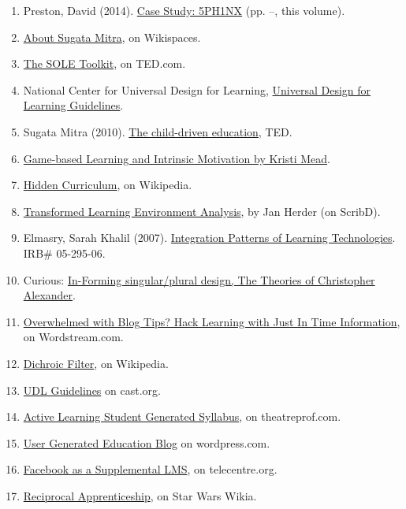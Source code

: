\begin{enumerate}
\item
  Preston, David (2014). \href{http://peeragogy.org/case-study-5ph1nx/}{Case Study:
  5PH1NX} (pp. \pageref{sphinx-beginning}--\pageref{sphinx-end}, this volume).
\item
  \href{http://sugatam.wikispaces.com/}{About Sugata Mitra}, on Wikispaces.
\item
  \href{http://www.ted.com/pages/sole\_toolkit}{The SOLE Toolkit}, on TED.com.
\item National Center for Universal Design for Learning,
  \href{http://www.udlcenter.org/aboutudl/udlguidelines}{Universal Design for
  Learning Guidelines}.
\item Sugata Mitra (2010).
  \href{http://www.ted.com/talks/sugata\_mitra\_the\_child\_driven\_education.html}{The child-driven education}, TED.
\item
  \href{http://www.academia.edu/1137269/Game-based\_Learning\_and\_Intrinsic\_Motivation}{Game-based
  Learning and Intrinsic Motivation by Kristi Mead}.
\item
  \href{http://en.wikipedia.org/wiki/Hidden\_curriculum}{Hidden Curriculum}, on Wikipedia.
\item
  \href{http://www.scribd.com/doc/181089012/Transformed-Learning-Environment-Analysis}{Transformed
  Learning Environment Analysis}, by Jan Herder (on ScribD).
\item
  Elmasry, Sarah Khalil (2007). \href{http://scholar.lib.vt.edu/theses/available/etd-09232007-220306/unrestricted/SElmasryETDbodytext.pdf}{Integration
  Patterns of Learning Technologies}. IRB\# 05-295-06.
\item
  Curious: \href{http://nourdiab.wordpress.com/2011/02/23/the-theories-of-christopher-alexander/}{In-Forming
  singular/plural design, The Theories of Christopher Alexander}.
\item
  \href{http://www.wordstream.com/blog/ws/2013/10/02/just-in-time-information-hacks}{Overwhelmed
  with Blog Tips? Hack Learning with Just In Time Information}, on Wordstream.com.
\item
  \href{http://en.wikipedia.org/wiki/Dichroic\_filter}{Dichroic Filter}, on Wikipedia.
\item \href{http://www.cast.org/library/UDLguidelines/}{UDL Guidelines} on cast.org.
\item
  \href{http://www.theatreprof.com/2011/active-learning-student-generated-syllabus/}{Active
  Learning Student Generated Syllabus}, on theatreprof.com.
\item
  \href{http://usergeneratededucation.wordpress.com/}{User Generated
  Education Blog} on wordpress.com.
\item
  \href{http://community.telecentre.org/profiles/blogs/facebook-as-a-supplemental-lms}{Facebook
  as a Supplemental LMS}, on telecentre.org.
\item
  \href{http://starwars.wikia.com/wiki/Reciprocal\_apprenticeship}{Reciprocal
  Apprenticeship}, on Star Wars Wikia.
\end{enumerate}

